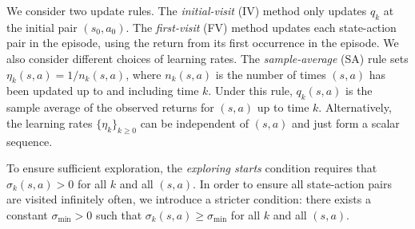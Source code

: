 \documentclass{article}
\begin{document}
% 
% 
We consider two update rules.
The \emph{initial-visit} (IV) method only updates $q_k$ at the initial pair $(s_0,a_0)$.
The \emph{first-visit} (FV) method updates each state-action pair in the episode, using the return from its first occurrence in the episode.
We also consider different choices of learning rates.
The \emph{sample-average} (SA) rule sets $\eta_k(s,a) = 1/n_k(s,a)$, where $n_k(s,a)$ is the number of times $(s,a)$ has been updated up to and including time $k$. Under this rule, $q_{k}(s,a)$ is the sample average of the observed returns for $(s,a)$ up to time $k$.
Alternatively, the learning rates $\{\eta_k\}_{k \ge 0}$ can be independent of $(s,a)$ and just form a scalar sequence.

To ensure sufficient exploration,
the \emph{exploring starts} 
condition requires that $\sigma_k(s,a) > 0$ for all $k$ and all $(s,a)$.
In order to ensure all state-action pairs are visited infinitely often, we introduce a stricter condition:
there exists a constant $\sigma_{\min}>0$ such that $\sigma_k(s,a) \ge \sigma_{\min}$ for all $k$ and all $(s,a)$.
\end{document}
